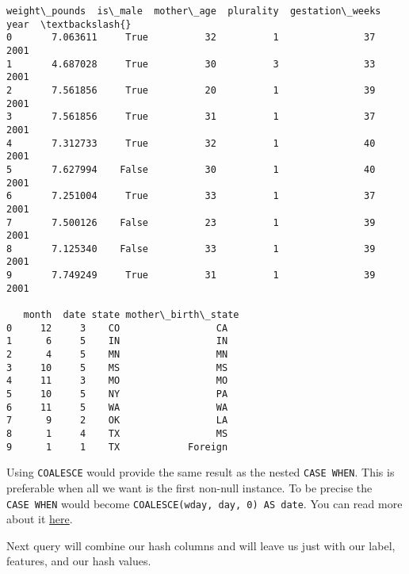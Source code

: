 \documentclass[11pt]{article}
\makeatletter
\newcommand{\boxspacing}{\kern\kvtcb@left@rule\kern\kvtcb@boxsep}
\newcommand{\prompt}[4]{
        \ttfamily\llap{{\color{#2}[#3]:\hspace{3pt}#4}}\vspace{-\baselineskip}
    }
\makeatother
\begin{document}
            \begin{tcolorbox}[breakable, size=fbox, boxrule=.5pt, pad at break*=1mm, opacityfill=0]
\prompt{Out}{outcolor}{7}{\boxspacing}
\begin{Verbatim}[commandchars=\\\{\}]
   weight\_pounds  is\_male  mother\_age  plurality  gestation\_weeks  year  \textbackslash{}
0       7.063611     True          32          1               37  2001
1       4.687028     True          30          3               33  2001
2       7.561856     True          20          1               39  2001
3       7.561856     True          31          1               37  2001
4       7.312733     True          32          1               40  2001
5       7.627994    False          30          1               40  2001
6       7.251004     True          33          1               37  2001
7       7.500126    False          23          1               39  2001
8       7.125340    False          33          1               39  2001
9       7.749249     True          31          1               39  2001

   month  date state mother\_birth\_state
0     12     3    CO                 CA
1      6     5    IN                 IN
2      4     5    MN                 MN
3     10     5    MS                 MS
4     11     3    MO                 MO
5     10     5    NY                 PA
6     11     5    WA                 WA
7      9     2    OK                 LA
8      1     4    TX                 MS
9      1     1    TX            Foreign
\end{Verbatim}
\end{tcolorbox}
        
    Using \texttt{COALESCE} would provide the same result as the nested
\texttt{CASE\ WHEN}. This is preferable when all we want is the first
non-null instance. To be precise the \texttt{CASE\ WHEN} would become
\texttt{COALESCE(wday,\ day,\ 0)\ AS\ date}. You can read more about it
\href{https://cloud.google.com/bigquery/docs/reference/standard-sql/conditional_expressions}{here}.

    Next query will combine our hash columns and will leave us just with our
label, features, and our hash values.
\end{document}
